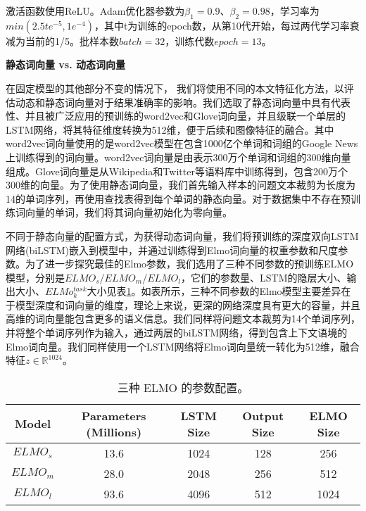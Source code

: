 激活函数使用ReLU。Adam优化器参数为$\beta_1=0.9$、$\beta_2=0.98$，学习率为$min(2.5te^{-5}, 1e^{-4})$，其中t为训练的epoch数，从第10代开始，每过两代学习率衰减为当前的1/5。批样本数$batch = 32$，训练代数$epoch=13$。

\textbf{静态词向量 vs. 动态词向量}

在固定模型的其他部分不变的情况下， 我们将使用不同的本文特征化方法，以评估动态和静态词向量对于结果准确率的影响。我们选取了静态词向量中具有代表性、并且被广泛应用的预训练的word2vec和Glove词向量，并且级联一个单层的LSTM网络，将其特征维度转换为512维，便于后续和图像特征的融合。其中word2vec词向量使用的是word2vec模型在包含1000亿个单词和词组的Google News上训练得到的词向量。word2vec词向量是由表示300万个单词和词组的300维向量组成。Glove词向量是从Wikipedia和Twitter等语料库中训练得到，包含200万个300维的向量。为了使用静态词向量，我们首先输入样本的问题文本裁剪为长度为14的单词序列，再使用查找表得到每个单词的静态向量。对于数据集中不存在预训练词向量的单词，我们将其词向量初始化为零向量。

不同于静态向量的配置方式，为获得动态词向量，我们将预训练的深度双向LSTM网络(biLSTM)嵌入到模型中，并通过训练得到Elmo词向量的权重参数和尺度参数。为了进一步探究最佳的Elmo参数，我们选用了三种不同参数的预训练ELMO模型，分别是$ELMO_s$/$ELMO_m$/$ELMO_l$，它们的参数量、LSTM的隐层大小、输出大小、$ELMo_k^{task}$大小见表\ref{ELMO_models}。如表所示，三种不同参数的Elmo模型主要差异在于模型深度和词向量的维度，理论上来说，更深的网络深度具有更大的容量，并且高维的词向量能包含更多的语义信息。我们同样将问题文本裁剪为14个单词序列，并将整个单词序列作为输入，通过两层的biLSTM网络，得到包含上下文语境的Elmo词向量。我们同样使用一个LSTM网络将Elmo词向量统一转化为512维，融合特征$z \in \mathbb{R}^{1024}$。
\begin{table}[H]
\centering
\caption{三种 ELMO 的参数配置。}
\begin{tabular}{ccccc}
\toprule
\textbf{Model} & \textbf{Parameters (Millions)} & \textbf{LSTM Size} & \textbf{Output Size} & \textbf{ELMO Size}\\
\midrule
$ELMO_s$&  13.6& 1024&  128& 256\\
$ELMO_m$&  28.0& 2048&  256& 512\\
$ELMO_l$&  93.6& 4096&  512& 1024\\
\bottomrule
\end{tabular}
\label{ELMO_models}
\end{table}

